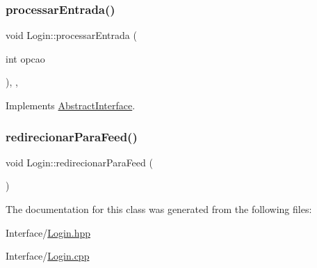 \subsubsection{\texorpdfstring{processar\+Entrada()}{processarEntrada()}}
{\footnotesize\ttfamily void Login\+::processar\+Entrada (\begin{DoxyParamCaption}\item[{int}]{opcao }\end{DoxyParamCaption})\hspace{0.3cm}{\ttfamily [override]}, {\ttfamily [private]}, {\ttfamily [virtual]}}



Implements \hyperlink{class_abstract_interface_acf8223a1da27c6986158836a57fa51ee}{Abstract\+Interface}.

\mbox{\label{class_login_a9588b070d2843cd8cf2af475b66bfd1b}} 
\subsubsection{\texorpdfstring{redirecionar\+Para\+Feed()}{redirecionarParaFeed()}}
{\footnotesize\ttfamily void Login\+::redirecionar\+Para\+Feed (\begin{DoxyParamCaption}{ }\end{DoxyParamCaption})\hspace{0.3cm}{\ttfamily [private]}}



The documentation for this class was generated from the following files\+:\begin{DoxyCompactItemize}
\item 
Interface/\hyperlink{_login_8hpp}{Login.\+hpp}\item 
Interface/\hyperlink{_login_8cpp}{Login.\+cpp}\end{DoxyCompactItemize}
